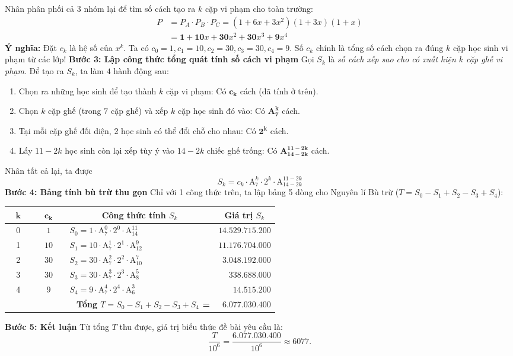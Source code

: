 \begin{ex}
{		Nhân phân phối cả 3 nhóm lại để tìm số cách tạo ra $k$ cặp vi phạm cho toàn trường:
		\begin{align*}
			P &= P_A \cdot P_B \cdot P_C = (1 + 6x + 3x^2)(1 + 3x)(1 + x) \\
			&= \mathbf{1} + \mathbf{10}x + \mathbf{30}x^2 + \mathbf{30}x^3 + \mathbf{9}x^4
		\end{align*}
		\textbf{Ý nghĩa:} Đặt $c_k$ là hệ số của $x^k$. Ta có
		$c_0=1, c_1=10, c_2=30, c_3=30, c_4=9$. Số $c_k$ chính là tổng số cách chọn ra đúng $k$ cặp học sinh vi phạm từ các lớp!
		\textbf{Bước 3: Lập công thức tổng quát tính số cách vi phạm}
		Gọi $S_k$ là \textit{số cách xếp sao cho có xuất hiện $k$ cặp ghế vi phạm}. Để tạo ra $S_k$, ta làm $4$ hành động sau:
		\begin{enumerate}
			\item Chọn ra những học sinh để tạo thành $k$ cặp vi phạm: Có $\mathbf{c_k}$ cách (đã tính ở trên).
			\item Chọn $k$ cặp ghế (trong $7$ cặp ghế) và xếp $k$ cặp học sinh đó vào: Có $\mathbf{A_7^k}$ cách.
			\item Tại mỗi cặp ghế đối diện, 2 học sinh có thể đổi chỗ cho nhau: Có $\mathbf{2^k}$ cách.
			\item Lấy $11 - 2k$ học sinh còn lại xếp tùy ý vào $14 - 2k$ chiếc ghế trống: Có $\mathbf{A_{14 - 2k}^{11 - 2k}}$ cách.
		\end{enumerate}
		Nhân tất cả lại, ta được
		$$S_k = c_k \cdot \mathrm{A}_7^k \cdot 2^k \cdot \mathrm{A}_{14-2k}^{11-2k}$$
		\textbf{Bước 4: Bảng tính bù trừ thu gọn}
		Chỉ với 1 công thức trên, ta lập bảng 5 dòng cho Nguyên lí Bù trừ ($T = S_0 - S_1 + S_2 - S_3 + S_4$):
		\begin{center}
			\renewcommand{\arraystretch}{1.5}
			\begin{tabular}{|c|c|p{0.55\linewidth}|r|}
				\hline
				$\mathbf{k}$ & $\mathbf{c_k}$ & \multicolumn{1}{c|}{\textbf{Công thức tính $S_k$}} & \multicolumn{1}{c|}{\textbf{Giá trị $S_k$}} \\ \hline
				0 & $1$ & $S_0 = 1 \cdot \mathrm{A}_7^0 \cdot 2^0 \cdot \mathrm{A}_{14}^{11}$ & $14.529.715.200$ \\ \hline
				1 & $10$ & $S_1 = 10 \cdot \mathrm{A}_7^1 \cdot 2^1 \cdot \mathrm{A}_{12}^9$ & $11.176.704.000$ \\ \hline
				2 & $30$ & $S_2 = 30 \cdot \mathrm{A}_7^2 \cdot 2^2 \cdot \mathrm{A}_{10}^7$ & $3.048.192.000$ \\ \hline
				3 & $30$ & $S_3 = 30 \cdot \mathrm{A}_7^3 \cdot 2^3 \cdot \mathrm{A}_8^5$ & $338.688.000$ \\ \hline
				4 & $9$ & $S_4 = 9 \cdot \mathrm{A}_7^4 \cdot 2^4 \cdot \mathrm{A}_6^3$ & $14.515.200$ \\ \hline
				\multicolumn{3}{|r|}{\textbf{Tổng $T = S_0 - S_1 + S_2 - S_3 + S_4$ =}} & $\mathbf{6.077.030.400}$ \\ \hline
			\end{tabular}
		\end{center}
		\textbf{Bước 5: Kết luận}
		Từ tổng $T$ thu được, giá trị biểu thức đề bài yêu cầu là:
		$$\dfrac{T}{10^6} = \dfrac{6.077.030.400}{10^6} \approx 6077.$$
	}
\end{ex}
